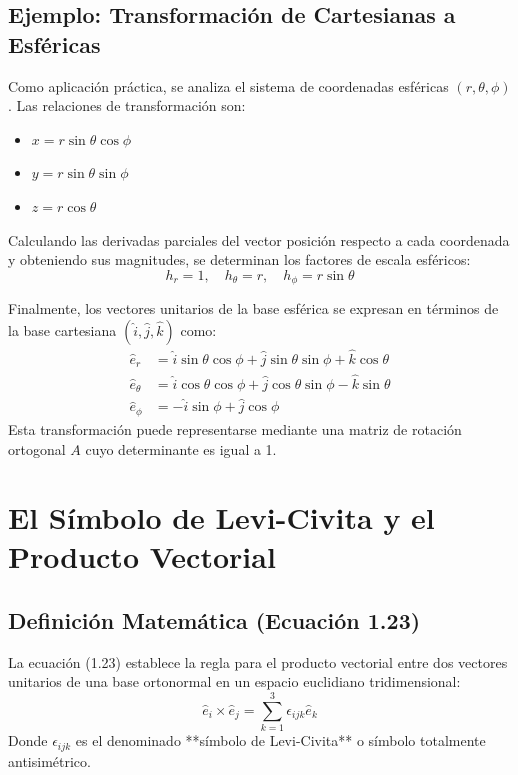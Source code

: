 \documentclass[a4paper]{article}
\begin{document}
\subsection{Ejemplo: Transformación de Cartesianas a Esféricas}
Como aplicación práctica, se analiza el sistema de coordenadas esféricas $(r, \theta, \phi)$. Las relaciones de transformación son:
\begin{itemize}
    \item $x = r \sin\theta \cos\phi$
    \item $y = r \sin\theta \sin\phi$
    \item $z = r \cos\theta$
\end{itemize}

Calculando las derivadas parciales del vector posición respecto a cada coordenada y obteniendo sus magnitudes, se determinan los factores de escala esféricos:
\begin{equation}
h_r = 1, \quad h_\theta = r, \quad h_\phi = r \sin\theta
\end{equation}

Finalmente, los vectores unitarios de la base esférica se expresan en términos de la base cartesiana $(\hat{i}, \hat{j}, \hat{k})$ como:
\begin{align}
    \hat{e}_r &= \hat{i} \sin\theta \cos\phi + \hat{j} \sin\theta \sin\phi + \hat{k} \cos\theta \\
    \hat{e}_\theta &= \hat{i} \cos\theta \cos\phi + \hat{j} \cos\theta \sin\phi - \hat{k} \sin\theta \\
    \hat{e}_\phi &= -\hat{i} \sin\phi + \hat{j} \cos\phi
\end{align}
Esta transformación puede representarse mediante una matriz de rotación ortogonal $A$ cuyo determinante es igual a 1.


\section{El Símbolo de Levi-Civita y el Producto Vectorial}

\subsection{Definición Matemática (Ecuación 1.23)}
La ecuación (1.23) establece la regla para el producto vectorial entre dos vectores unitarios de una base ortonormal en un espacio euclidiano tridimensional:
\begin{equation}
    \hat{e}_i \times \hat{e}_j = \sum_{k=1}^{3} \epsilon_{ijk} \hat{e}_k
\end{equation}
Donde $\epsilon_{ijk}$ es el denominado **símbolo de Levi-Civita** o símbolo totalmente antisimétrico.
\end{document}
